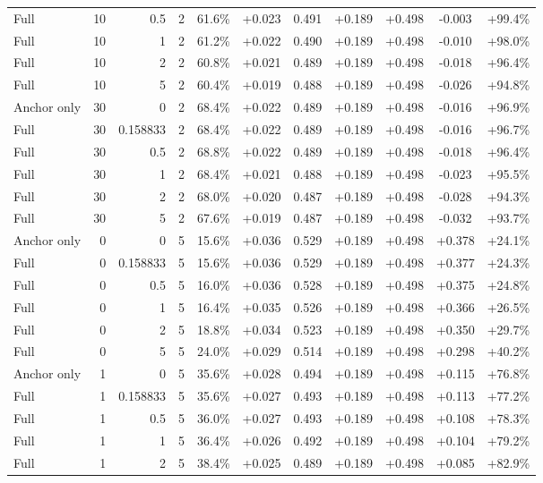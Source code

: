 \begin{table}[htbp]
\begin{tabular}{lrrrccccccc}
Full & 10 & 0.5 & 2 & 61.6\% & +0.023 & 0.491 & +0.189 & +0.498 & -0.003 & +99.4\% \\
Full & 10 & 1 & 2 & 61.2\% & +0.022 & 0.490 & +0.189 & +0.498 & -0.010 & +98.0\% \\
Full & 10 & 2 & 2 & 60.8\% & +0.021 & 0.489 & +0.189 & +0.498 & -0.018 & +96.4\% \\
Full & 10 & 5 & 2 & 60.4\% & +0.019 & 0.488 & +0.189 & +0.498 & -0.026 & +94.8\% \\
Anchor only & 30 & 0 & 2 & 68.4\% & +0.022 & 0.489 & +0.189 & +0.498 & -0.016 & +96.9\% \\
Full & 30 & 0.158833 & 2 & 68.4\% & +0.022 & 0.489 & +0.189 & +0.498 & -0.016 & +96.7\% \\
Full & 30 & 0.5 & 2 & 68.8\% & +0.022 & 0.489 & +0.189 & +0.498 & -0.018 & +96.4\% \\
Full & 30 & 1 & 2 & 68.4\% & +0.021 & 0.488 & +0.189 & +0.498 & -0.023 & +95.5\% \\
Full & 30 & 2 & 2 & 68.0\% & +0.020 & 0.487 & +0.189 & +0.498 & -0.028 & +94.3\% \\
Full & 30 & 5 & 2 & 67.6\% & +0.019 & 0.487 & +0.189 & +0.498 & -0.032 & +93.7\% \\
Anchor only & 0 & 0 & 5 & 15.6\% & +0.036 & 0.529 & +0.189 & +0.498 & +0.378 & +24.1\% \\
Full & 0 & 0.158833 & 5 & 15.6\% & +0.036 & 0.529 & +0.189 & +0.498 & +0.377 & +24.3\% \\
Full & 0 & 0.5 & 5 & 16.0\% & +0.036 & 0.528 & +0.189 & +0.498 & +0.375 & +24.8\% \\
Full & 0 & 1 & 5 & 16.4\% & +0.035 & 0.526 & +0.189 & +0.498 & +0.366 & +26.5\% \\
Full & 0 & 2 & 5 & 18.8\% & +0.034 & 0.523 & +0.189 & +0.498 & +0.350 & +29.7\% \\
Full & 0 & 5 & 5 & 24.0\% & +0.029 & 0.514 & +0.189 & +0.498 & +0.298 & +40.2\% \\
Anchor only & 1 & 0 & 5 & 35.6\% & +0.028 & 0.494 & +0.189 & +0.498 & +0.115 & +76.8\% \\
Full & 1 & 0.158833 & 5 & 35.6\% & +0.027 & 0.493 & +0.189 & +0.498 & +0.113 & +77.2\% \\
Full & 1 & 0.5 & 5 & 36.0\% & +0.027 & 0.493 & +0.189 & +0.498 & +0.108 & +78.3\% \\
Full & 1 & 1 & 5 & 36.4\% & +0.026 & 0.492 & +0.189 & +0.498 & +0.104 & +79.2\% \\
Full & 1 & 2 & 5 & 38.4\% & +0.025 & 0.489 & +0.189 & +0.498 & +0.085 & +82.9\% \\

\end{tabular}
\end{table}
